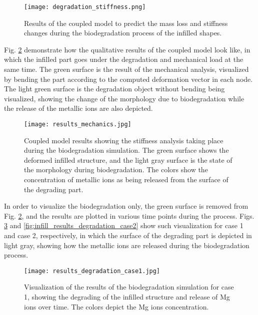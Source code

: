 \begin{figure}[h]
\centering
\medskip
\texttt{[image: degradation\_stiffness.png]}
\caption[Results of the coupled model to predict the stiffness changes during biodegradation]{Results of the coupled model to predict the mass loss and stiffness changes during the biodegradation process of the infilled shapes.} \label{fig:infill_degradation_stiffness}
\end{figure}

Fig. \ref{fig:infill_results_mechanics} demonstrate how the qualitative results of the coupled model look like, in which the infilled part goes under the degradation and mechanical load at the same time. The green surface is the result of the mechanical analysis, visualized by bending the part according to the computed deformation vector in each node. The light green surface is the degradation object without bending being visualized, showing the change of the morphology due to biodegradation while the release of the metallic ions are also depicted.


\begin{figure}[h]
\centering
\medskip
\texttt{[image: results\_mechanics.jpg]}
\caption[Coupled model results showing the stiffness analysis taking place during biodegradation simulation]{Coupled model results showing the stiffness analysis taking place during the biodegradation simulation. The green surface shows the deformed infilled structure, and the light gray surface is the state of the morphology during biodegradation. The colors show the concentration of metallic ions as being released from the surface of the degrading part.} \label{fig:infill_results_mechanics}
\end{figure}

In order to visualize the biodegradation only, the green surface is removed from Fig. \ref{fig:infill_results_mechanics}, and the results are plotted in various time points during the process. Figs. \ref{fig:infill_results_degradation_case1} and \ref{fig:infill_results_degradation_case2} show such visualization for case 1 and case 2, respectively, in which the surface of the degrading part is depicted in light gray, showing how the metallic ions are released during the biodegradation process. 

\begin{figure}[h]
\centering
\medskip
\texttt{[image: results\_degradation\_case1.jpg]}
\caption[Visualization of the results of the biodegradation simulation for case 1]{Visualization of the results of the biodegradation simulation for case 1, showing the degrading of the infilled structure and release of Mg ions over time. The colors depict the Mg ions concentration.} \label{fig:infill_results_degradation_case1}
\end{figure}


